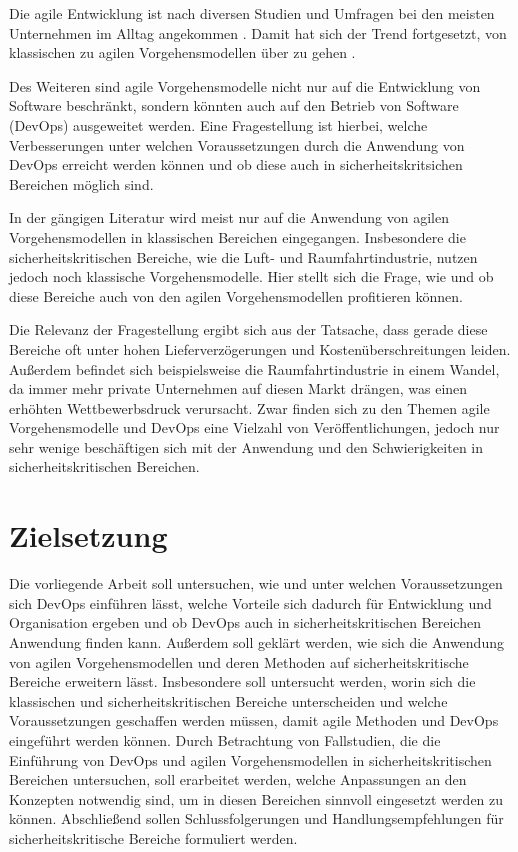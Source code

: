 Die agile Entwicklung ist nach diversen Studien und Umfragen bei den meisten Unternehmen im Alltag angekommen \parencite[vgl.][]{VersionOne:2015aa, HP:2015aa}. 
Damit hat sich der Trend fortgesetzt, von klassischen zu agilen Vorgehensmodellen über zu gehen \parencite[vgl.][]{Rodriguez:2012:SAL:2372251.2372275}.

Des Weiteren sind agile Vorgehensmodelle nicht nur auf die Entwicklung von Software beschränkt, sondern könnten auch auf den Betrieb von Software (DevOps) ausgeweitet werden.
Eine Fragestellung ist hierbei, welche Verbesserungen unter welchen Voraussetzungen durch die Anwendung von DevOps erreicht werden können und ob diese auch in sicherheitskritsichen Bereichen möglich sind.

In der gängigen Literatur wird meist nur auf die Anwendung von agilen Vorgehensmodellen in klassischen Bereichen eingegangen.
Insbesondere die sicherheitskritischen Bereiche, wie die Luft- und Raumfahrtindustrie, nutzen jedoch noch klassische Vorgehensmodelle.
Hier stellt sich die Frage, wie und ob diese Bereiche auch von den agilen Vorgehensmodellen profitieren können.

Die Relevanz der Fragestellung ergibt sich aus der Tatsache, dass gerade diese Bereiche oft unter hohen Lieferverzögerungen und Kostenüberschreitungen leiden.
Außerdem befindet sich beispielsweise die Raumfahrtindustrie in einem Wandel, da immer mehr private Unternehmen auf diesen Markt drängen, was einen erhöhten Wettbewerbsdruck verursacht.
Zwar finden sich zu den Themen agile Vorgehensmodelle und DevOps eine Vielzahl von Veröffentlichungen, jedoch nur sehr wenige beschäftigen sich mit der Anwendung und den Schwierigkeiten in sicherheitskritischen Bereichen.

\section{Zielsetzung}

Die vorliegende Arbeit soll untersuchen, wie und unter welchen Voraussetzungen sich DevOps einführen lässt, welche Vorteile sich dadurch für Entwicklung und Organisation ergeben und ob DevOps auch in sicherheitskritischen Bereichen Anwendung finden kann.
Außerdem soll geklärt werden, wie sich die Anwendung von agilen Vorgehensmodellen und deren Methoden auf sicherheitskritische Bereiche erweitern lässt.
Insbesondere soll untersucht werden, worin sich die klassischen und sicherheitskritischen Bereiche unterscheiden und welche Voraussetzungen geschaffen werden müssen, damit agile Methoden und DevOps eingeführt werden können.
Durch Betrachtung von Fallstudien, die die Einführung von DevOps und agilen Vorgehensmodellen in sicherheitskritischen Bereichen untersuchen, soll erarbeitet werden, welche Anpassungen an den Konzepten notwendig sind, um in diesen Bereichen sinnvoll eingesetzt werden zu können.
Abschließend sollen Schlussfolgerungen und Handlungsempfehlungen für sicherheitskritische Bereiche formuliert werden.


